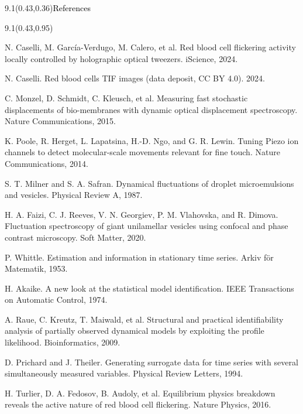 \documentclass[t]{beamer}
\newcommand{\gtitle}[1]{\begin{textblock}{9.1}(0.43,0.36)\fontsize{20}{24}\selectfont\textcolor{black}{#1}\end{textblock}}
\newcommand{\gbox}[4]{\begin{textblock}{#3}(#1,#2)#4\end{textblock}}
\begin{document}
\begin{frame}
\gtitle{References}
\gbox{0.43}{0.95}{9.1}{\fontsize{10}{11.5}\selectfont\raggedright
\setlength{\parskip}{5pt}
N. Caselli, M. Garc\'ia-Verdugo, M. Calero, et al. Red blood cell flickering activity locally controlled by
holographic optical tweezers. iScience, 2024.\par
N. Caselli. Red blood cells TIF images (data deposit, CC BY 4.0). 2024.\par
C. Monzel, D. Schmidt, C. Kleusch, et al. Measuring fast stochastic displacements of bio-membranes with dynamic
optical displacement spectroscopy. Nature Communications, 2015.\par
K. Poole, R. Herget, L. Lapatsina, H.-D. Ngo, and G. R. Lewin. Tuning Piezo ion channels to detect
molecular-scale movements relevant for fine touch. Nature Communications, 2014.\par
S. T. Milner and S. A. Safran. Dynamical fluctuations of droplet microemulsions and vesicles. Physical Review A,
1987.\par
H. A. Faizi, C. J. Reeves, V. N. Georgiev, P. M. Vlahovska, and R. Dimova. Fluctuation spectroscopy of giant
unilamellar vesicles using confocal and phase contrast microscopy. Soft Matter, 2020.\par
P. Whittle. Estimation and information in stationary time series. Arkiv f\"or Matematik, 1953.\par
H. Akaike. A new look at the statistical model identification. IEEE Transactions on Automatic Control, 1974.\par
A. Raue, C. Kreutz, T. Maiwald, et al. Structural and practical identifiability analysis of partially observed
dynamical models by exploiting the profile likelihood. Bioinformatics, 2009.\par
D. Prichard and J. Theiler. Generating surrogate data for time series with several simultaneously measured
variables. Physical Review Letters, 1994.\par
H. Turlier, D. A. Fedosov, B. Audoly, et al. Equilibrium physics breakdown reveals the active nature of red blood
cell flickering. Nature Physics, 2016.\par}
\end{frame}

\appendix
\end{document}

